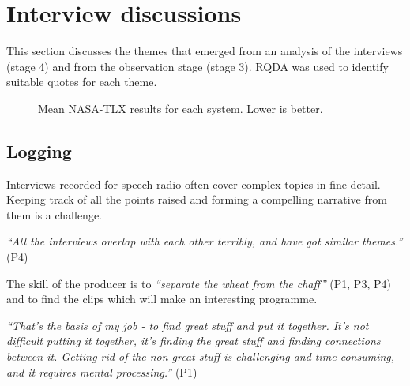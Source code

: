 \section{Interview discussions}
This section discusses the themes that emerged from an analysis of the
interviews (stage 4) and from the observation stage (stage 3). RQDA was used to
identify suitable quotes for each theme.

\begin{figure}
\centering
  \caption{Mean NASA-TLX results for each system. Lower is better.}
  \label{fig:tlx}
\end{figure}

\vfill
\clearcolumn
\subsection{Logging}
Interviews recorded for speech radio often cover complex topics in fine
detail. Keeping track of all the points raised and forming a compelling
narrative from them is a challenge.

\textit{``All the interviews overlap with each other terribly, and have got
  similar themes.''} (P4)

The skill of the producer is to \textit{``separate the wheat from the chaff''}
(P1, P3, P4) and to find the clips which will make an interesting programme.

\textit{``That's the basis of my job - to find great stuff and put it together.
  It's not difficult putting it together, it's finding the great stuff and
  finding connections between it. Getting rid of the non-great stuff is
  challenging and time-consuming, and it requires mental processing.''} (P1)

